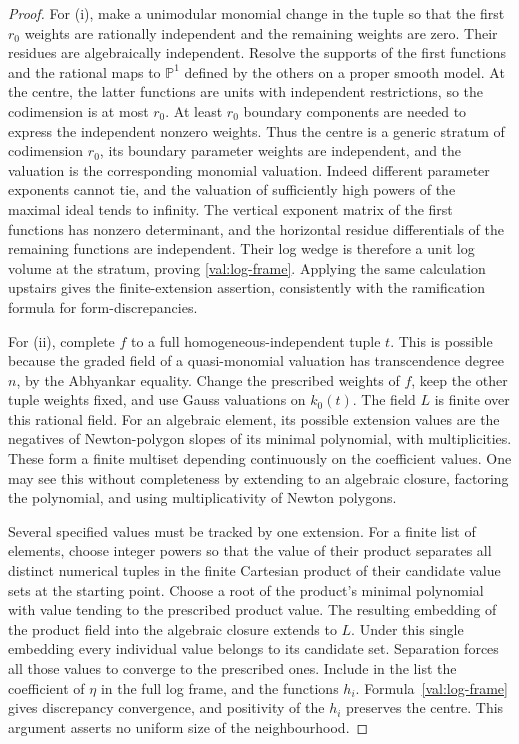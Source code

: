 \begin{proof}
For (i), make a unimodular monomial change in the tuple so that the
first $r_0$ weights are rationally independent and the remaining
weights are zero. Their residues are algebraically independent.
Resolve the supports of the first functions and the rational maps to
$\mathbb P^1$ defined by the others on a proper smooth model. At the
centre, the latter functions are units with independent restrictions,
so the codimension is at most $r_0$. At least $r_0$ boundary components
are needed to express the independent nonzero weights. Thus the centre
is a generic stratum of codimension $r_0$, its boundary parameter
weights are independent, and the valuation is the corresponding
monomial valuation. Indeed different parameter exponents cannot tie,
and the valuation of sufficiently high powers of the maximal ideal
tends to infinity. The vertical exponent matrix of the first
functions has nonzero determinant, and the horizontal residue
differentials of the remaining functions are independent. Their log
wedge is therefore a unit log volume at the stratum, proving
\eqref{val:log-frame}. Applying the same calculation upstairs gives
the finite-extension assertion, consistently with the ramification
formula for form-discrepancies.

For (ii), complete $f$ to a full homogeneous-independent tuple $t$.
This is possible because the graded field of a quasi-monomial
valuation has transcendence degree $n$, by the Abhyankar equality.
Change the prescribed weights of $f$, keep the other tuple weights
fixed, and use Gauss valuations on $k_0(t)$. The field $L$ is finite
over this rational field. For an algebraic element, its possible
extension values are the negatives of Newton-polygon slopes of its
minimal polynomial, with multiplicities. These form a finite multiset
depending continuously on the coefficient values. One may see this
without completeness by extending to an algebraic closure, factoring
the polynomial, and using multiplicativity of Newton polygons.

Several specified values must be tracked by one extension. For a
finite list of elements, choose integer powers so that the value of
their product separates all distinct numerical tuples in the finite
Cartesian product of their candidate value sets at the starting
point. Choose a root of the product's minimal polynomial with value
tending to the prescribed product value. The resulting embedding of
the product field into the algebraic closure extends to $L$. Under
this single embedding every individual value belongs to its candidate
set. Separation forces all those values to converge to the prescribed
ones. Include in the list the coefficient of $\eta$ in the full log
frame, and the functions $h_i$. Formula~\eqref{val:log-frame} gives
discrepancy convergence, and positivity of the $h_i$ preserves the
centre. This argument asserts no uniform size of the neighbourhood.


\end{proof}
